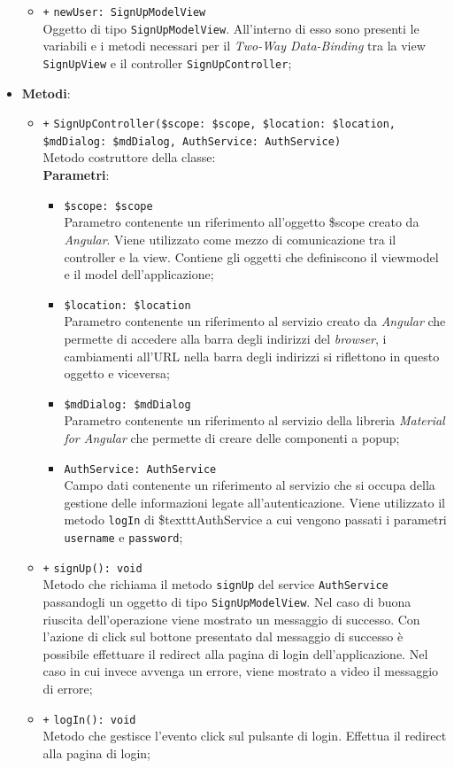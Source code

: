 \begin{itemize}
\begin{itemize}
		\item \texttt{+} \texttt{newUser: SignUpModelView} \\
		Oggetto di tipo \texttt{SignUpModelView}. All'interno di esso sono presenti le variabili e i metodi necessari per il \textit{Two-Way Data-Binding} tra la view \texttt{SignUpView} e il controller \texttt{SignUpController};
	\end{itemize}
	\item \textbf{Metodi}:
	\begin{itemize}
		\item \texttt{+} \texttt{SignUpController(\$scope: \$scope, \$location: \$location, \$mdDialog: \$mdDialog, AuthService: AuthService)} \\
		Metodo costruttore della classe: \\
		\textbf{Parametri}:
		\begin{itemize}
			\item \texttt{\$scope: \$scope} \\
			Parametro contenente un riferimento all’oggetto \$scope creato da \textit{Angular}. Viene utilizzato come mezzo di comunicazione tra il controller e la view. Contiene gli oggetti che definiscono il viewmodel e il model dell’applicazione;
			\item \texttt{\$location: \$location} \\
			Parametro contenente un riferimento al servizio creato da \textit{Angular} che permette di accedere alla barra degli indirizzi del \textit{browser}, i cambiamenti all’URL nella barra degli indirizzi si riflettono in questo oggetto e viceversa;
			\item \texttt{\$mdDialog: \$mdDialog} \\
			Parametro contenente un riferimento al servizio della libreria \textit{Material for Angular} che permette di creare delle componenti a popup;
			\item \texttt{AuthService: AuthService} \\
			Campo dati contenente un riferimento al servizio che si occupa della gestione delle informazioni legate all’autenticazione. Viene utilizzato il metodo \texttt{logIn} di \$texttt{AuthService} a cui vengono passati i parametri \texttt{username} e \texttt{password};
		\end{itemize}
		\item \texttt{+} \texttt{signUp(): void} \\
		Metodo che richiama il metodo \texttt{signUp} del service \texttt{AuthService} passandogli un oggetto di tipo \texttt{SignUpModelView}. Nel caso di buona riuscita dell'operazione viene mostrato un messaggio di successo. Con l'azione di click sul bottone presentato dal messaggio di successo è possibile effettuare il redirect alla pagina di login dell'applicazione. Nel caso in cui invece avvenga un errore, viene mostrato a video il messaggio di errore;
		\item \texttt{+} \texttt{logIn(): void} \\
		Metodo che gestisce l’evento click sul pulsante di login. Effettua il redirect alla pagina di login;
	

\end{itemize}
\end{itemize}
